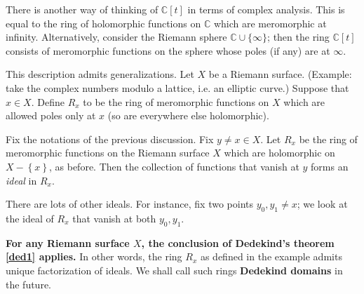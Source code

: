 There is another way of thinking of $\mathbb{C}[t]$ in terms of complex
analysis.  This is equal to the ring of holomorphic functions on $\mathbb{C}$
which are meromorphic at infinity.  
Alternatively, consider the Riemann sphere $\mathbb{C} \cup \{ \infty\}$; then the ring $\mathbb{C}[t]$
consists of meromorphic functions on the sphere whose poles (if any) are at
$\infty$. 

This description admits generalizations. 
Let $X$ be a
Riemann surface.  (Example: take the complex numbers modulo a lattice, i.e. an
elliptic curve.)
Suppose that $x \in X$. Define $R_x$ to be the ring of meromorphic functions on $X$
which are allowed poles only at $x$ (so are everywhere else holomorphic). 

\begin{example} Fix the notations of the previous discussion. 
Fix $y \neq x \in X$. Let $R_x$ be the ring of meromorphic functions on the
Riemann surface $X$ which are holomorphic on $X - \left\{x\right\}$, as before.
Then the collection of functions that vanish at $y$ forms an
\emph{ideal} in $R_x$. 

There are lots of other ideals. For instance, fix two
points $y_0, y_1 \neq x$; we look at the ideal of $R_x$ that vanish at both $y_0, y_1$.

\end{example} 


\textbf{For any Riemann surface $X$, the conclusion of Dedekind's theorem  \ref{ded1} applies.  } In other
words, the ring  $R_x$ as defined in the example admits  unique factorization of
ideals. We shall call such rings \textbf{Dedekind domains} in the future.

